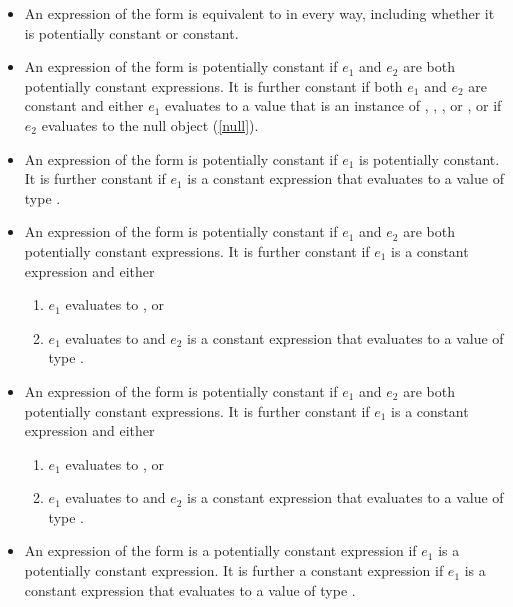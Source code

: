 \documentclass[makeidx]{article}
\begin{document}
\begin{itemize}
\item An expression of the form  is equivalent to  in every way, including whether it is potentially constant or constant.

\item An expression of the form  is potentially constant if $e_1$ and $e_2$ are both potentially constant expressions. It is further constant if both $e_1$ and $e_2$ are constant and either $e_1$ evaluates to a value that is an instance of , , ,  or , or if $e_2$ evaluates to the null object (\ref{null}).

\item An expression of the form  is potentially constant if $e_1$ is potentially constant. It is further constant if $e_1$ is a constant expression that evaluates to a value of type .

\item An expression of the form  is potentially constant if $e_1$ and $e_2$ are both potentially constant expressions. It is further constant if $e_1$ is a constant expression and either
\begin{enumerate}
\item $e_1$ evaluates to \FALSE{}, or
\item $e_1$ evaluates to \TRUE{} and $e_2$ is a constant expression that evaluates to a value of type .
\end{enumerate}

\item An expression of the form  is potentially constant if $e_1$ and $e_2$ are both potentially constant expressions. It is further constant if $e_1$ is a constant expression and either
\begin{enumerate}
\item $e_1$ evaluates to \TRUE{}, or
\item $e_1$ evaluates to \FALSE{} and $e_2$ is a constant expression that evaluates to a value of type .
\end{enumerate}

\item An expression of the form  is a potentially constant expression if $e_1$ is a potentially constant expression. It is further a constant expression if $e_1$ is a constant expression that evaluates to a value of type .


\end{itemize}
\end{document}
